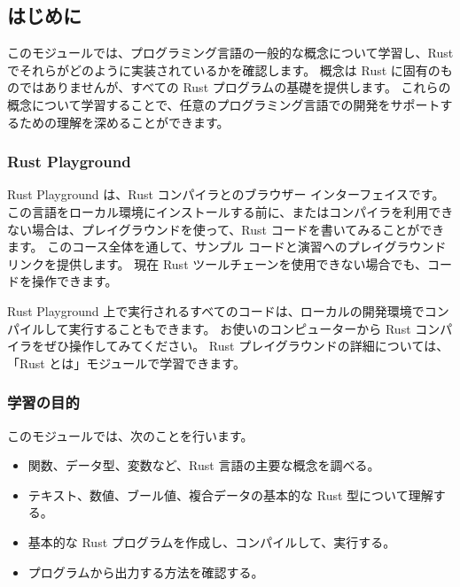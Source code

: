 \subsection{はじめに}

このモジュールでは、プログラミング言語の一般的な概念について学習し、Rust でそれらがどのように実装されているかを確認します。 概念は Rust に固有のものではありませんが、すべての Rust プログラムの基礎を提供します。 これらの概念について学習することで、任意のプログラミング言語での開発をサポートするための理解を深めることができます。

\subsubsection{Rust Playground}

Rust Playground は、Rust コンパイラとのブラウザー インターフェイスです。 この言語をローカル環境にインストールする前に、またはコンパイラを利用できない場合は、プレイグラウンドを使って、Rust コードを書いてみることができます。 このコース全体を通して、サンプル コードと演習へのプレイグラウンド リンクを提供します。 現在 Rust ツールチェーンを使用できない場合でも、コードを操作できます。

Rust Playground 上で実行されるすべてのコードは、ローカルの開発環境でコンパイルして実行することもできます。 お使いのコンピューターから Rust コンパイラをぜひ操作してみてください。 Rust プレイグラウンドの詳細については、「Rust とは」モジュールで学習できます。

\subsubsection{学習の目的}


このモジュールでは、次のことを行います。

\begin{itemize}
\item 関数、データ型、変数など、Rust 言語の主要な概念を調べる。
\item テキスト、数値、ブール値、複合データの基本的な Rust 型について理解する。
\item 基本的な Rust プログラムを作成し、コンパイルして、実行する。
\item プログラムから出力する方法を確認する。
\end{itemize}

